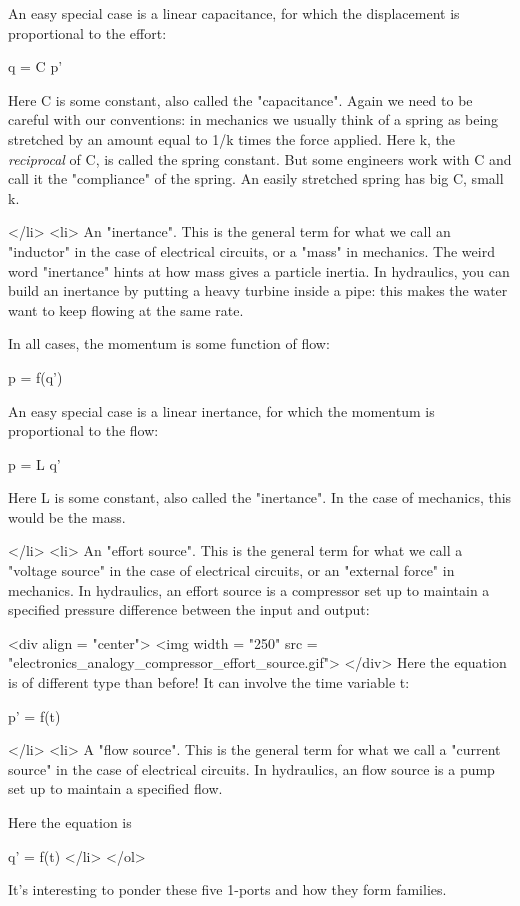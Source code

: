   An easy special case is a linear capacitance, for which the 
  displacement is proportional to the effort:

  q = C p'

  Here C is some constant, also called the "capacitance".
  Again we need to be careful with our conventions: in mechanics we
  usually think of a spring as being stretched by an amount equal to
  1/k times the force applied.  Here k, the \emph{reciprocal} of C, is
  called the spring constant.  But some engineers work with C and call
  it the "compliance" of the spring.  An easily stretched
  spring has big C, small k.

</li>
<li> 
  An "inertance".  This is the general term for what we
  call an "inductor" in the case of electrical circuits, or
  a "mass" in mechanics.  The weird word
  "inertance" hints at how mass gives a particle inertia.
  In hydraulics, you can build an inertance by putting a heavy turbine
  inside a pipe: this makes the water want to keep flowing at the same
  rate.

  In all cases, the momentum is some function of flow:

  p = f(q')

  An easy special case is a linear inertance, for which the 
  momentum is proportional to the flow:

  p = L q'

  Here L is some constant, also called the "inertance".  In
  the case of mechanics, this would be the mass.

</li>
<li>
  An "effort source".  This is the general term for what we
  call a "voltage source" in the case of electrical
  circuits, or an "external force" in mechanics.  In 
  hydraulics, an effort source is a compressor set up to maintain a 
  specified pressure difference between the input and output:

<div align = "center">
<img width = "250" src = "electronics_analogy_compressor_effort_source.gif">
</div>
Here the
equation is of different type than before!  It can involve the time
variable t:

  p' = f(t)
  
</li>
<li>
  A "flow source".  This is the general term for what we
  call a "current source" in the case of electrical
  circuits.  In hydraulics, an flow source is a pump set up to
  maintain a specified flow.

Here the equation is

  q' = f(t)
</li>
</ol>

It's interesting to ponder these five 1-ports and how they form
families.

